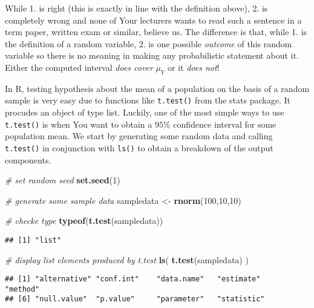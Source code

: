 \documentclass[]{book}
\newenvironment{Shaded}{\begin{snugshade}}{\end{snugshade}}
\newcommand{\KeywordTok}[1]{\textcolor[rgb]{0.13,0.29,0.53}{\textbf{#1}}}
\newcommand{\DecValTok}[1]{\textcolor[rgb]{0.00,0.00,0.81}{#1}}
\newcommand{\StringTok}[1]{\textcolor[rgb]{0.31,0.60,0.02}{#1}}
\newcommand{\CommentTok}[1]{\textcolor[rgb]{0.56,0.35,0.01}{\textit{#1}}}
\newcommand{\NormalTok}[1]{#1}
\theoremstyle{definition}
\theoremstyle{definition}
\theoremstyle{definition}
\theoremstyle{remark}
\begin{document}
While 1. is right (this is exactly in line with the definition above),
2. is completely wrong and none of Your lecturers wants to read such a
sentence in a term paper, written exam or similar, believe us. The
difference is that, while 1. is the definition of a random variable, 2.
is one possible \emph{outcome} of this random variable so there is no
meaning in making any probabilistic statement about it. Either the
computed interval \emph{does cover} \(\mu_Y\) or it \emph{does not}!

In R, testing hypothesis about the mean of a population on the basis of
a random sample is very easy due to functions like \texttt{t.test()}
from the stats package. It procudes an object of type list. Luckily, one
of the most simple ways to use \texttt{t.test()} is when You want to
obtain a \(95\%\) confidence interval for some population mean. We start
by generating some random data and calling \texttt{t.test()} in
conjunction with \texttt{ls()} to obtain a breakdown of the output
components.

\begin{Shaded}
\begin{Highlighting}[]
\CommentTok{# set random seed}
\KeywordTok{set.seed}\NormalTok{(}\DecValTok{1}\NormalTok{)}

\CommentTok{# generate some sample data}
\NormalTok{sampledata <-}\StringTok{ }\KeywordTok{rnorm}\NormalTok{(}\DecValTok{100}\NormalTok{,}\DecValTok{10}\NormalTok{,}\DecValTok{10}\NormalTok{)}

\CommentTok{# checke type}
\KeywordTok{typeof}\NormalTok{(}\KeywordTok{t.test}\NormalTok{(sampledata))}
\end{Highlighting}
\end{Shaded}

\begin{verbatim}
## [1] "list"
\end{verbatim}

\begin{Shaded}
\begin{Highlighting}[]
\CommentTok{# display list elements produced by t.test}
\KeywordTok{ls}\NormalTok{(}
  \KeywordTok{t.test}\NormalTok{(sampledata)}
\NormalTok{)}
\end{Highlighting}
\end{Shaded}

\begin{verbatim}
## [1] "alternative" "conf.int"    "data.name"   "estimate"    "method"     
## [6] "null.value"  "p.value"     "parameter"   "statistic"
\end{verbatim}
\end{document}
